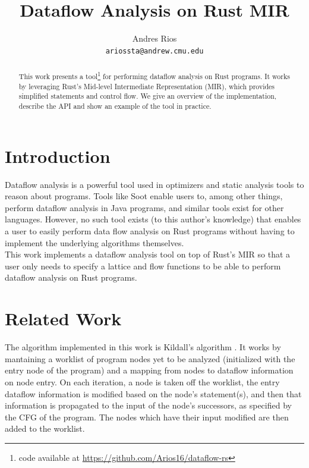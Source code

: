 \documentclass[11pt,a4paper]{article}
\title{Dataflow Analysis on Rust MIR}
\author{Andres Rios \\
  \texttt{ariossta@andrew.cmu.edu} \\}
\date{}
\begin{document}
\maketitle
\begin{abstract}
    This work presents a tool\footnote{code available at \href{https://github.com/Arios16/dataflow-rs}{https://github.com/Arios16/dataflow-rs}} for performing dataflow analysis on Rust
    programs. It works by leveraging Rust's Mid-level Intermediate
    Representation (MIR), which provides simplified statements and
    control flow. We give an overview of the implementation, describe
    the API and show an example of the tool in practice.
\end{abstract}

\section{Introduction}

Dataflow analysis is a powerful tool used in optimizers and static analysis
tools to reason about programs. Tools like Soot \cite{Soot} enable users
to, among other things, perform dataflow analysis in Java programs, and similar tools
exist for other languages. However, no such tool exists (to this author's knowledge) 
that enables a user to easily perform data flow analysis on Rust programs without 
having to implement the underlying algorithms themselves. \\

This work implements a dataflow analysis tool on top of Rust's MIR 
so that a user only needs to specify a lattice and flow functions to be
able to perform dataflow analysis on Rust programs.

\section{Related Work}

The algorithm implemented in this work is Kildall's algorithm
\cite{Kildall:1973:UAG:512927.512945}.
It works by mantaining a worklist of program nodes yet to be analyzed
(initialized with the entry node of the program) and a mapping from
nodes to dataflow information on node entry.
On each iteration, a node is taken off the worklist, the entry dataflow 
information is modified based on the node's statement(s), and then that information
is propagated to the input of the node's successors, as specified by the
CFG of the program. The nodes which have  their input modified
are then added to the worklist.\\
\end{document}
